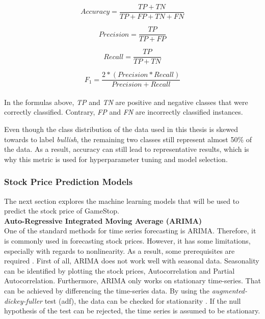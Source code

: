 \documentclass[11pt, a4paper]{article}
\begin{document}
\begin{equation*}
    Accuracy = \frac{TP+TN}{TP+FP+TN+FN}
\end{equation*}

\begin{equation*}
    Precision = \frac{TP}{TP+FP}
\end{equation*}

\begin{equation*}
    Recall = \frac{TP}{TP+TN}
\end{equation*}

\begin{equation*}
    F_{1}=\frac{2*(Precision * Recall)}{Precision + Recall}
\end{equation*}
\\
\noindent In the formulas above, \emph{TP} and \emph{TN} are positive and negative classes that were correctly classified. Contrary, \emph{FP} and \emph{FN} are
incorrectly classified instances.

Even though the class distribution of the data used in this thesis is skewed towards to label \emph{bullish}, the remaining two classes still represent
almost 50\% of the data. As a result, accuracy can still lead to representative results, which is why this metric is used for hyperparameter tuning and model selection.

\subsubsection{Stock Price Prediction Models}
The next section explores the machine learning models that will be used to predict the stock price of GameStop. \\

\noindent\textbf{Auto-Regressive Integrated Moving Average (ARIMA)}\\
One of the standard methods for time series forecasting is ARIMA. Therefore, it is commonly used in forecasting stock prices.
However, it has some limitations, especially with regards to nonlinearity.
As a result, some prerequisites are required \citep{sima2018timeseries}.
First of all, ARIMA does not work well with seasonal data. Seasonality can be identified by plotting the stock prices, Autocorrelation and Partial Autocorrelation.
Furthermore, ARIMA only works on stationary time-series. 
That can be achieved by differencing the time-series data. By using the \emph{augmented-dickey-fuller} test (adf),
the data can be checked for stationarity \citep{jain2017ASO}.
If the null hypothesis of the test can be rejected, the time series is assumed to be stationary. \\
\end{document}
